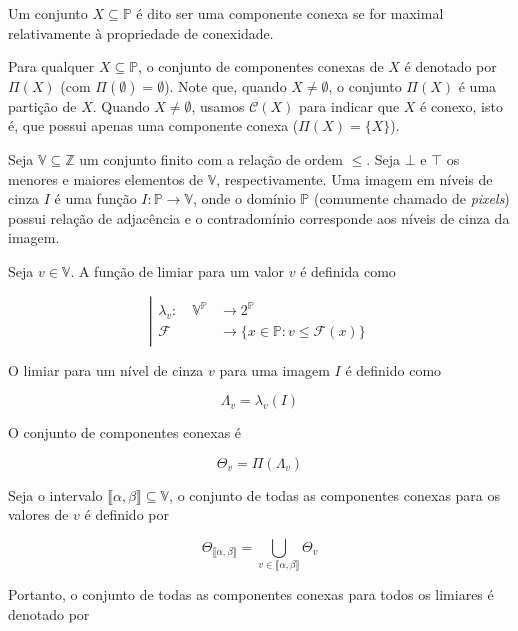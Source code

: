 \begin{definition}
    Um conjunto $X \subseteq \mathbb{P}$ é dito ser uma componente conexa
    se for maximal relativamente à propriedade de conexidade.
\end{definition}

Para qualquer $X \subseteq \mathbb{P}$, o conjunto de componentes conexas de $X$
é denotado por $\Pi(X)$ (com $\Pi(\emptyset)=\emptyset$). Note que,
quando $X \ne \emptyset$, o conjunto $\Pi(X)$ é uma partição de $X$.
Quando $X \ne \emptyset$, usamos $\mathscr{C}(X)$ para indicar que $X$ é conexo, isto é, que possui apenas uma componente conexa
($\Pi(X)=\{X\}$).

\begin{definition}
Seja $\mathbb{V} \subseteq \mathbb{Z}$ um conjunto finito com a relação de ordem
$\le$. Seja $\bot$ e $\top$ os menores e maiores elementos de $\mathbb{V}$, respectivamente.
Uma imagem em níveis de cinza $I$ é uma função $I:\mathbb{P}\rightarrow\mathbb{V}$, onde
o domínio $\mathbb{P}$ (comumente chamado de \textit{pixels}) possui relação de adjacência e o contradomínio
corresponde aos níveis de cinza da imagem.
\end{definition}

Seja $v \in \mathbb{V}$. A função de limiar para um valor $v$ é definida como

\begin{equation}
    \left| \begin{aligned}
        \lambda_v : \quad \mathbb{V}^{\mathbb{P}} & \longrightarrow 2^{\mathbb{P}} \\
        \mathcal{F} & \longrightarrow \{x \in \mathbb{P} : v \le \mathcal{F}(x)\}
    \end{aligned} \right.
    \label{eq:limiar}
\end{equation}

O limiar para um nível de cinza $v$ para uma imagem $I$ é definido como

$$\Lambda_v = \lambda_v(I)$$

O conjunto de componentes conexas é

$$\Theta_v = \Pi (\Lambda_v)$$

Seja o intervalo $\llbracket \alpha, \beta \rrbracket \subseteq \mathbb{V}$,
o conjunto de todas as componentes conexas para os valores de $v$ é definido por

$$\Theta_{\llbracket \alpha, \beta \rrbracket} = \bigcup_{v \in \llbracket \alpha, \beta \rrbracket} \Theta_v$$

Portanto, o conjunto de todas as componentes conexas para todos os limiares
é denotado por 

